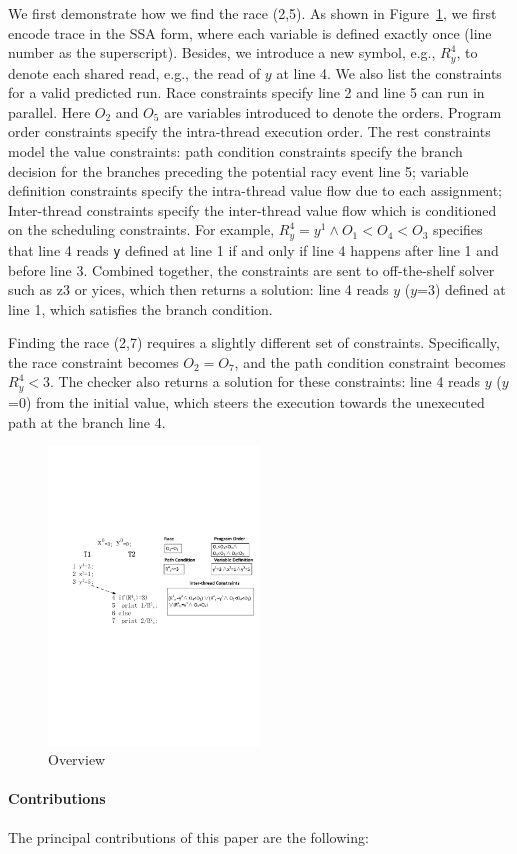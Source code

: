 We first demonstrate how we find the race (2,5). As shown in Figure~\ref{fig:demo}, we first encode trace in the SSA form, where each variable is defined exactly once (line number as the superscript). Besides, we introduce a new symbol, e.g., $R^4_{y}$,  to denote each shared read, e.g., the read of $y$ at   
 line 4. We also list the constraints for a valid predicted run. Race constraints specify line 2 and line 5 can run in parallel. Here $O_2$ and $O_5$ are  variables introduced to denote the orders. Program order constraints specify the intra-thread execution order. The rest  constraints model the value constraints: path condition constraints specify the branch decision for the branches preceding the potential racy event line 5; variable definition 
 constraints specify the intra-thread value flow due to each assignment; Inter-thread constraints specify the inter-thread value flow which is conditioned on the scheduling constraints. For example, $R^4_{y}=y^1 \wedge O_1< O_4 <O_3$ specifies that line 4 reads {\tt y} defined at line 1 if and only if line 4   
  happens after line 1 and before line 3.  Combined together, the constraints are sent to off-the-shelf solver such as z3 or yices, which then returns a solution: line 4 reads $y$ ($y$=3) defined at line 1, which satisfies the branch condition. 
  
Finding the race (2,7) requires a slightly different set of constraints. Specifically, the race constraint becomes $O_2=O_7$, and the path condition constraint becomes $R^4_y<3$. The checker also returns a solution for these constraints: line 4 reads $y$ ($y$=0) from the initial value, which steers the execution towards the unexecuted path at the branch line 4.

  
  

\begin{figure}
\centering
\includegraphics[width=0.5\textwidth]{figs/Visio-demo.pdf}
\caption{Overview}
\label{fig:demo}
\end{figure}






\paragraph{Contributions} The principal contributions of this paper are the following:

